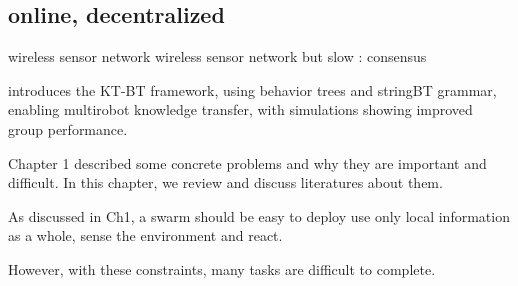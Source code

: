 \subsection {online, decentralized}
\cite{xie2011design} wireless sensor network
\cite{wang2006reprogramming} wireless sensor network
but slow : consensus
\cite{de2009energy}
\cite{varadharajan2018over} 



\cite{venkata2023kt} introduces the KT-BT framework, using behavior trees and stringBT grammar, enabling multirobot knowledge transfer, with simulations showing improved group performance.
















Chapter 1 described some concrete problems and why they are important and difficult.
In this chapter, we review and discuss literatures about them.

As discussed in Ch1, a swarm should be
    easy to deploy
    use only local information
    as a whole, sense the environment and react.

However, with these constraints, many tasks are difficult to complete.

